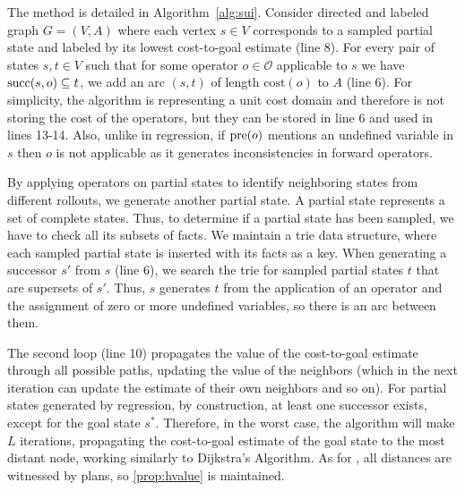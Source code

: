 The method is detailed in Algorithm~\ref{alg:sui}. Consider directed and labeled graph $G=(V,A)$ where each vertex $s \in V$ corresponds to a sampled partial state and labeled by its lowest cost-to-goal estimate (line 8). For every pair of states $s,t\in V$ such that for some operator $o\in\mathcal{O}$ applicable to $s$ we have $\operatorname{succ}(s,o)\subseteq t$, we add an arc $(s,t)$ of length $\text{cost}(o)$ to $A$ (line 6). For simplicity, the algorithm is representing a unit cost domain and therefore is not storing the cost of the operators, but they can be stored in line 6 and used in lines 13-14. Also, unlike in regression, if $\operatorname{pre}(o)$ mentions an undefined variable in $s$ then $o$ is not applicable as it generates inconsistencies in forward operators. 

By applying operators on partial states to identify neighboring states from different rollouts, we generate another partial state. A partial state represents a set of complete states. Thus, to determine if a partial state has been sampled, we have to check all its subsets of facts. We maintain a trie data structure, where each sampled partial state is inserted with its facts as a key. When generating a successor $s'$ from $s$ (line 6), we search the trie for sampled partial states $t$ that are supersets of $s'$. Thus, $s$ generates $t$ from the application of an operator and the assignment of zero or more undefined variables, so there is an arc between them.

The second loop (line 10) propagates the value of the cost-to-goal estimate through all possible paths, updating the value of the neighbors (which in the next iteration can update the estimate of their own neighbors and so on). For partial states generated by regression, by construction, at least one successor exists, except for the goal state $s^*$. Therefore, in the worst case, the algorithm will make $L$ iterations, propagating the cost-to-goal estimate of the goal state to the most distant node, working similarly to Dijkstra's Algorithm. As for \hmin, all distances are witnessed by plans, so \cref{prop:hvalue} is maintained.

